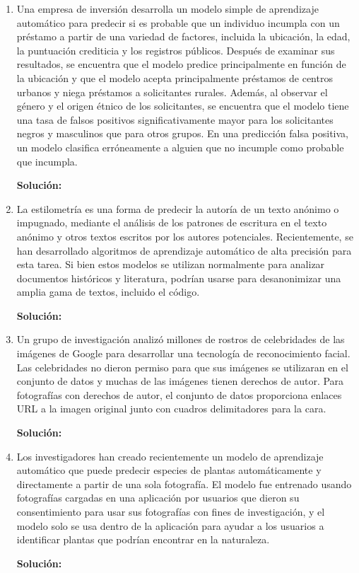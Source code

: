 \documentclass[11pt,letterpaper]{article}
\newenvironment{solution}{%
  \noindent\begin{shaded}
  \textbf{Solución:}\ }{
  \end{shaded}%
}
\begin{document}
\begin{enumerate}
\item%
  Una empresa de inversión desarrolla un modelo simple de aprendizaje
  automático para predecir si es probable que un individuo incumpla
  con un préstamo a partir de una variedad de factores, incluida la
  ubicación, la edad, la puntuación crediticia y los registros
  públicos.  Después de examinar sus resultados, se encuentra que el
  modelo predice principalmente en función de la ubicación y que el
  modelo acepta principalmente préstamos de centros urbanos y niega
  préstamos a solicitantes rurales.  Además, al observar el género y
  el origen étnico de los solicitantes, se encuentra que el modelo
  tiene una tasa de falsos positivos significativamente mayor para los
  solicitantes negros y masculinos que para otros grupos.  En una
  predicción falsa positiva, un modelo clasifica erróneamente a
  alguien que no incumple como probable que incumpla.
  \begin{solution}
  \end{solution}
\item%
  La estilometría es una forma de predecir la autoría de un texto
  anónimo o impugnado, mediante el análisis de los patrones de
  escritura en el texto anónimo y otros textos escritos por los
  autores potenciales.  Recientemente, se han desarrollado algoritmos
  de aprendizaje automático de alta precisión para esta tarea.  Si
  bien estos modelos se utilizan normalmente para analizar documentos
  históricos y literatura, podrían usarse para desanonimizar una
  amplia gama de textos, incluido el código.
  \begin{solution}
  \end{solution}

\item%
  Un grupo de investigación analizó millones de rostros de
  celebridades de las imágenes de Google para desarrollar una
  tecnología de reconocimiento facial.  Las celebridades no dieron
  permiso para que sus imágenes se utilizaran en el conjunto de datos
  y muchas de las imágenes tienen derechos de autor.  Para fotografías
  con derechos de autor, el conjunto de datos proporciona enlaces URL
  a la imagen original junto con cuadros delimitadores para la cara.
  \begin{solution}
  \end{solution}
  
\item%
  Los investigadores han creado recientemente un modelo de aprendizaje
  automático que puede predecir especies de plantas automáticamente y
  directamente a partir de una sola fotografía.  El modelo fue
  entrenado usando fotografías cargadas en una aplicación por usuarios
  que dieron su consentimiento para usar sus fotografías con fines de
  investigación, y el modelo solo se usa dentro de la aplicación para
  ayudar a los usuarios a identificar plantas que podrían encontrar en
  la naturaleza.
  \begin{solution}
  \end{solution}
\end{enumerate}
\end{document}
